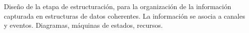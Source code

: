 Diseño de la etapa de estructuración, para la organización de la información capturada en estructuras de datos coherentes. La información se asocia a canales y eventos. Diagramas, máquinas de estados, recursos.